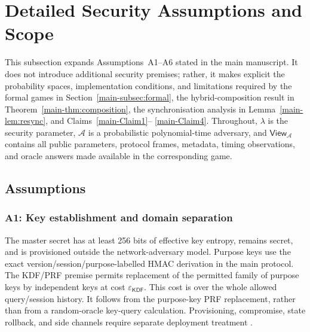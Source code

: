\documentclass[journal]{IEEEtran}
\theoremstyle{definition}
\theoremstyle{game}
\begin{document}
\section{Detailed Security Assumptions and Scope}
\label{subsec:security_assumptions}

This subsection expands Assumptions~A1--A6 stated in the main
manuscript. It does not introduce additional security premises;
rather, it makes explicit the probability spaces, implementation
conditions, and limitations required by the formal games in
Section~\ref{main-subsec:formal}, the hybrid-composition result in
Theorem~\ref{main-thm:composition}, the synchronisation analysis in
Lemma~\ref{main-lem:resync}, and Claims~\ref{main-Claim1}--
\ref{main-Claim4}. Throughout, $\lambda$ is the security parameter,
$\mathcal{A}$ is a probabilistic polynomial-time adversary, and
$\mathsf{View}_{\mathcal A}$ contains all public parameters,
protocol frames, metadata, timing observations, and oracle answers
made available in the corresponding game.
\subsection{Assumptions}

\subsubsection{A1: Key establishment and domain separation}\label{supp-assump:a1}
The master secret has at least 256 bits of effective key entropy, remains
secret, and is provisioned outside the network-adversary model. Purpose keys
use the exact version/session/purpose-labelled HMAC derivation in the main
protocol. The KDF/PRF premise permits replacement of the permitted family of
purpose keys by independent keys at cost $\varepsilon_{\mathsf{KDF}}$.
This cost is over the whole allowed query/session history. It follows
from the purpose-key PRF replacement, rather than from a random-oracle
key-query calculation. Provisioning, compromise, state rollback, and side
channels require separate deployment treatment \cite{nist80057pt1r5}.
\end{document}
